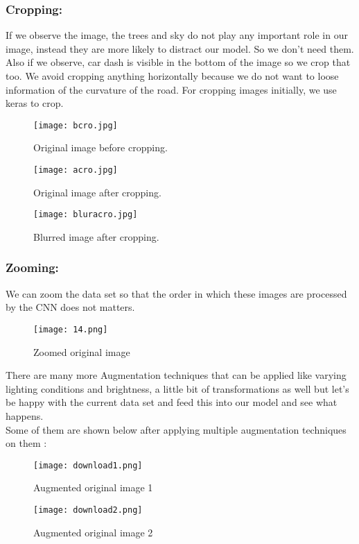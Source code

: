 \subsubsection{Cropping:}
 If we observe the image, the trees and sky do not play any important role in our image, instead they are more likely to distract our model. So we don’t need them. Also if we observe, car dash is visible in the bottom of the image so we crop that too. We avoid cropping anything horizontally because we do not want to loose information of the curvature of the road. For cropping images initially, we use keras to crop.
 \begin{figure}[H]
 	\centering
 	\texttt{[image: bcro.jpg]}
 	\caption{Original image before cropping.}
 \end{figure}
\begin{figure}[H]
	\centering
	\texttt{[image: acro.jpg]}
	\caption{Original image after cropping.}
\end{figure}
\begin{figure}[H]
	\centering
	\texttt{[image: bluracro.jpg]}
	\caption{Blurred image after cropping.}
\end{figure}

\subsubsection{Zooming: }
We can zoom the data set so that the order in which these images are processed by the CNN does not matters.\\
 \begin{figure}[H]
	\centering
	\texttt{[image: 14.png]}
	\caption{Zoomed original image}
\end{figure}


There are many more Augmentation techniques that can be applied like varying lighting conditions and brightness, a little bit of transformations as well but let’s be happy with the current data set and feed this into our model and see what happens.\\
Some of them are shown below after applying multiple augmentation techniques on them :\\
 \begin{figure}[H]
	\centering
	\texttt{[image: download1.png]}
	\caption{Augmented original image 1}
\end{figure} 
\begin{figure}[H]
	\centering
	\texttt{[image: download2.png]}
	\caption{Augmented original image 2}
\end{figure}

